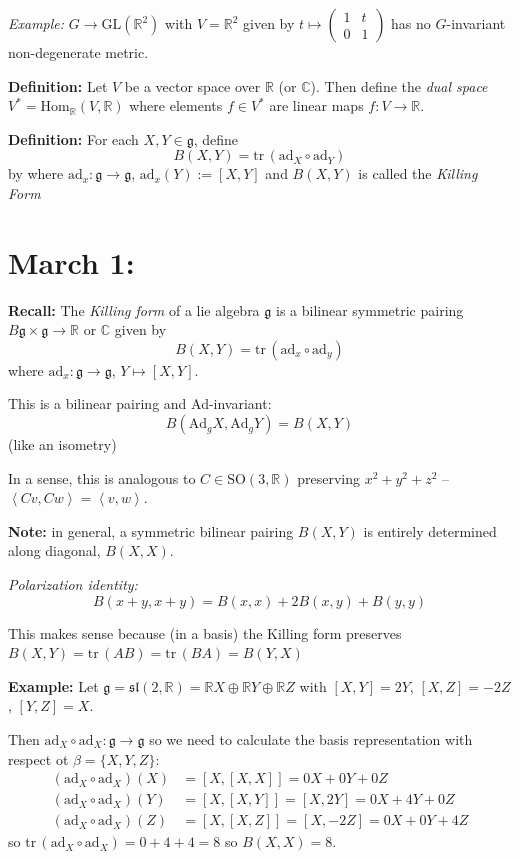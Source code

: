 \documentclass[12pt]{article}
\newcommand{\R}{\mathbb{R}}
\newcommand{\C}{\mathbb{C}}
\newcommand{\brak}[1]{\left\langle #1 \right\rangle}
\newcommand{\SO}{\text{SO}}
\newcommand{\GL}{\text{GL}}
\newcommand{\tr}{\text{tr}\,}
\newcommand{\g}{\mathfrak{g}}
\renewcommand{\sl}{\mathfrak{sl}}
\begin{document}
    \emph{Example:} $G \to \GL(\R^2)$ with $V = \R^2$ given by $t \mapsto \begin{pmatrix}
        1 & t\\ 
        0 & 1
    \end{pmatrix}$ has no $G$-invariant non-degenerate metric. 

    \textbf{Definition:} Let $V$ be a vector space over $\R$ (or $\C$). Then define the \emph{dual space} $V^* = \text{Hom}_{\R}(V, \R)$ where elements $f \in V^*$ are linear maps $f: V \to \R$.

    \textbf{Definition:} For each $X, Y \in \g$, define 
    \[B(X, Y) = \tr(\text{ad}_X \circ \text{ad}_Y)\]
    by where $\text{ad}_x: \g \to \g$, $\text{ad}_x(Y) := [X, Y]$ and $B(X, Y)$ is called the \emph{Killing Form}

\section{March 1:}
    \textbf{Recall:} The \emph{Killing form} of a lie algebra $\g$ is a bilinear symmetric pairing $B \g \times \g \to \R \text{ or } \C$ given by
    \[B(X, Y) = \tr(\text{ad}_x \circ \text{ad}_y)\]
    where $\text{ad}_x: \g \to \g$, $Y \mapsto [X, Y]$.

    This is a bilinear pairing and Ad-invariant: 
    \[B(\text{Ad}_g X, \text{Ad}_g Y) = B(X, Y)\] 
    (like an isometry)

    In a sense, this is analogous to $C \in \SO(3, \R)$ preserving $x^2 + y^2 + z^2$ -- $\brak{Cv, Cw} = \brak{v, w}$. 

    \textbf{Note:} in general, a symmetric bilinear pairing $B(X, Y)$ is entirely determined along diagonal, $B(X, X)$.

    \emph{Polarization identity:}
    \[B(x + y, x + y) = B(x, x) + 2B(x, y) + B(y, y)\] 

    This makes sense because (in a basis) the Killing form preserves $B(X, Y) = \tr(AB) = \tr(BA) = B(Y, X)$

    \textbf{Example:} Let $\g = \sl(2, \R) = \R X \oplus \R Y \oplus \R Z$ with $[X, Y] = 2Y$, $[X, Z] = -2Z$, $[Y, Z] = X$. 

    Then $\text{ad}_X \circ \text{ad}_X: \g \to \g$ so we need to calculate the basis representation with respect ot $\beta = \{X, Y, Z\}$: 
    \begin{align*}
        (\text{ad}_X \circ \text{ad}_X)(X) &= [X, [X, X]] = 0X + 0Y + 0Z\\ 
        (\text{ad}_X \circ \text{ad}_X)(Y) &= [X, [X, Y]] = [X, 2Y] = 0X + 4Y + 0Z\\ 
        (\text{ad}_X \circ \text{ad}_X)(Z) &= [X, [X, Z]] = [X, -2Z] = 0X + 0Y + 4Z
    \end{align*}
    so $\tr(\text{ad}_X \circ \text{ad}_X) = 0 + 4 + 4 = 8$ so $B(X, X) = 8$.
\end{document}
